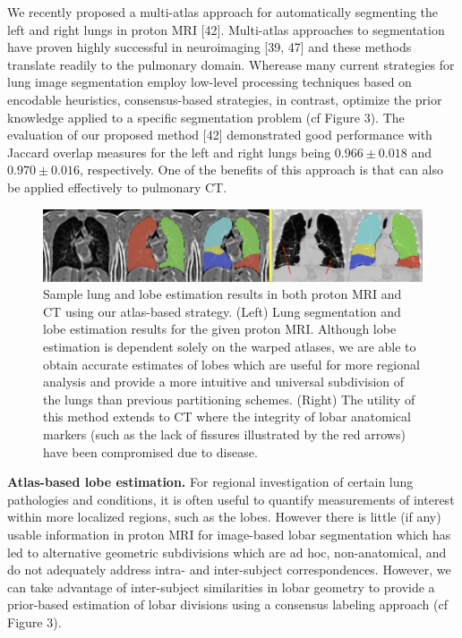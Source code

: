 \documentclass[11pt,]{article}
\begin{document}
We recently proposed a multi-atlas approach for automatically segmenting
the left and right lungs in proton MRI {[}42{]}. Multi-atlas approaches
to segmentation have proven highly successful in neuroimaging {[}39,
47{]} and these methods translate readily to the pulmonary domain.
Wherease many current strategies for lung image segmentation employ
low-level processing techniques based on encodable heuristics,
consensus-based strategies, in contrast, optimize the prior knowledge
applied to a specific segmentation problem (cf Figure 3). The evaluation
of our proposed method {[}42{]} demonstrated good performance with
Jaccard overlap measures for the left and right lungs being
$0.966 \pm 0.018$ and $0.970 \pm 0.016$, respectively. One of the
benefits of this approach is that can also be applied effectively to
pulmonary CT.

\begin{figure}[htbp]
\centering
\includegraphics{Figs/lungEstimation.png}
\caption{Sample lung and lobe estimation results in both proton MRI and
CT using our atlas-based strategy. (Left) Lung segmentation and lobe
estimation results for the given proton MRI. Although lobe estimation is
dependent solely on the warped atlases, we are able to obtain accurate
estimates of lobes which are useful for more regional analysis and
provide a more intuitive and universal subdivision of the lungs than
previous partitioning schemes. (Right) The utility of this method
extends to CT where the integrity of lobar anatomical markers (such as
the lack of fissures illustrated by the red arrows) have been
compromised due to disease.}
\end{figure}

\textbf{Atlas-based lobe estimation.} For regional investigation of
certain lung pathologies and conditions, it is often useful to quantify
measurements of interest within more localized regions, such as the
lobes. However there is little (if any) usable information in proton MRI
for image-based lobar segmentation which has led to alternative
geometric subdivisions which are ad hoc, non-anatomical, and do not
adequately address intra- and inter-subject correspondences. However, we
can take advantage of inter-subject similarities in lobar geometry to
provide a prior-based estimation of lobar divisions using a consensus
labeling approach (cf Figure 3).
\end{document}
